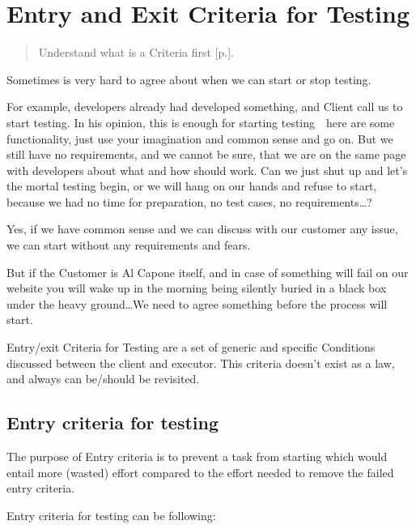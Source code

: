 \section{Entry and Exit Criteria for Testing}
\label{sec:Entry and Exit Criteria for Testing}

\begin{quote}
Understand what is a Criteria first [p.\pageref{sec:Criteria}].
\end{quote} 

Sometimes is very hard to agree about when we can start or stop testing.

For example, developers already had developed something, and Client call us to start testing. In his opinion, this is enough for starting testing~\textemdash~here are some functionality, just use your imagination and common sense and go on. But we still have no requirements, and we cannot be sure, that we are on the same page with developers about what and how should work. Can we just shut up and let's the mortal testing begin, or we will hang on our hands and refuse to start, because we had no time for preparation, no test cases, no requirements\ldots?

Yes, if we have common sense and we can discuss with our customer any issue, we can start without any requirements and fears.

But if the Customer is Al Capone itself, and in case of something will fail on our website you will wake up in the morning being silently buried in a black box under the heavy ground\ldots We need to agree something before the process will start.

Entry/exit Criteria for Testing are a set of generic and specific Conditions discussed between the client and executor. This criteria doesn't exist as a law, and always can be/should be revisited.

\subsection{Entry criteria for testing}
\label{sec:Entry criteria for testing}

The purpose of Entry criteria is to prevent a task from starting which would entail more (wasted) effort compared to the effort needed to remove the failed entry criteria.

Entry criteria for testing can be following:

